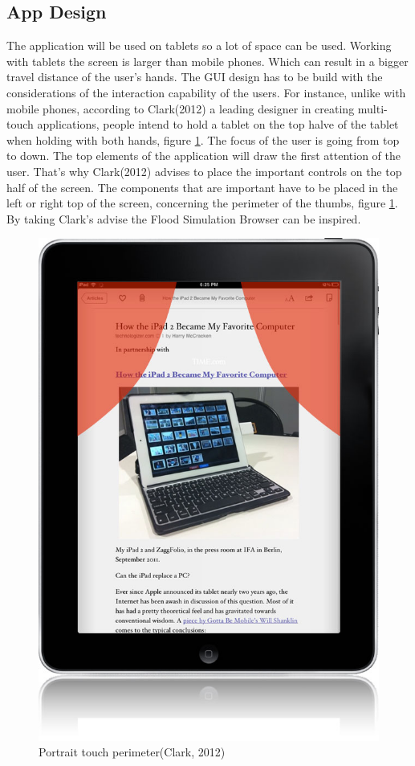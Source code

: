 \subsection{App Design} 
\label{sec:appdesign}
The application will be used on tablets so a lot of space can be used. Working with tablets the screen is larger than mobile phones. Which can result in a bigger travel distance of the user's hands. The GUI design has to be build with the considerations of the interaction capability of the users. For instance, unlike with mobile phones, according to Clark(2012) a leading designer in creating multi-touch applications, people intend to hold a tablet on the top halve of the tablet when holding with both hands, figure \ref{fig:perimeter}. The focus of the user is going from top to down. The top elements of the application will draw the first attention of the user. That's why Clark(2012) advises to place the important controls on the top half of the screen. The components that are important have to be placed in the left or right top of the screen, concerning the perimeter of the thumbs, figure \ref{fig:perimeter}. By taking Clark's advise the Flood Simulation Browser can be inspired.
\begin{figure}[H]
\center
\includegraphics[scale=0.3]{touch.png}
\caption{Portrait touch perimeter(Clark, 2012)}
\label{fig:perimeter}
\end{figure}
